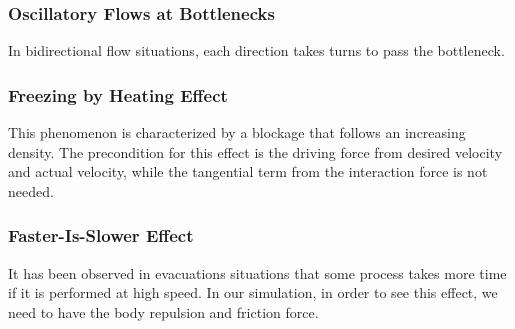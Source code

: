 \subsubsection{Oscillatory Flows at Bottlenecks}
In bidirectional flow situations, each direction takes turns to pass the 
bottleneck.

\subsubsection{Freezing by Heating Effect}
This phenomenon is characterized by a blockage that follows an increasing 
density. The precondition for this effect is the driving force from desired 
velocity and actual velocity, while the tangential term from the interaction 
force is not needed.

\subsubsection{Faster-Is-Slower Effect}
It has been observed in evacuations situations that some process takes more 
time if it is performed at high speed. In our simulation, in order to see this 
effect, we need to have the body repulsion and friction force.
